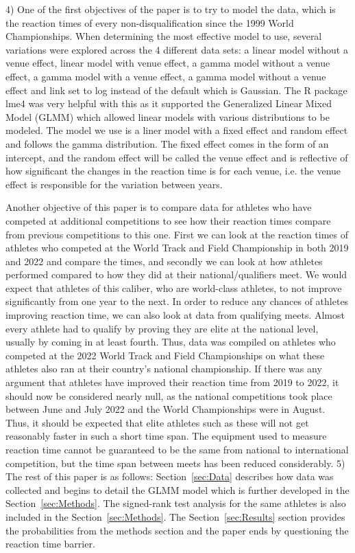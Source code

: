 \documentclass[12pt, letterpaper, titlepage]{article}
\begin{document}
4)
One of the first objectives of the paper is to try to model the data, which is
the reaction times of every non-disqualification since the 1999 World Championships. 
When determining the most effective model to use, several variations were
explored across the 4 different data sets: a linear model without a venue effect,
linear model with venue effect, a gamma model without a venue effect, a gamma model
with a venue effect, a gamma model without a venue effect and link set to log instead
of the default which is Gaussian.  The R package lme4 was very helpful with this
as it supported the Generalized Linear Mixed Model (GLMM) which allowed 
linear models with various distributions to be modeled\citep{Rpkg:lme4}.  The
model we use is a liner model with a fixed effect and random effect and follows
the gamma distribution. The fixed effect comes in the form of an intercept, and the
random effect will be called the venue effect and is reflective of how significant
the changes in the reaction time is for each venue, i.e. the venue effect is 
responsible for the variation between years. 

Another objective of this paper is to compare data for athletes who have competed
at additional competitions to see how their reaction times compare from previous
competitions to this one. First we can look at the reaction times of athletes who competed at the
World Track and Field Championship in both 2019 and 2022 and compare the times,
and secondly we can look at how athletes performed compared to how they did at
their national/qualifiers meet.  We would expect that athletes of this caliber,
who are world-class athletes, to not improve significantly from one year to the
next.  In order to reduce any chances of athletes improving reaction time, we
can also look at data from qualifying meets.  Almost every athlete had to qualify 
by proving they are elite at the national level, usually by coming in at least
fourth. Thus, data was compiled on athletes who competed
at the 2022 World Track and Field Championships on what these athletes also ran 
at their country's national championship. If there was any argument that athletes
have improved their reaction time from 2019 to 2022, it should now be considered
nearly null, as the national competitions took place between June and July 2022 
and the World Championships were in August.  Thus, it should be expected that 
elite athletes such as these will not get reasonably faster in such a short time
span. The equipment used to measure reaction time cannot be guaranteed to be
the same from national to international competition, but the time span between
meets has been reduced considerably.
5)
The rest of this paper is as follows: Section~\ref{sec:Data} describes how data was
collected and begins to detail the GLMM model which is further developed in the
Section~\ref{sec:Methods}.  The signed-rank test analysis for the same athletes is
also included in the Section~\ref{sec:Methods}.  The Section~\ref{sec:Results}
section provides the probabilities from the methods section and the paper ends 
by questioning the reaction time barrier.
\end{document}
